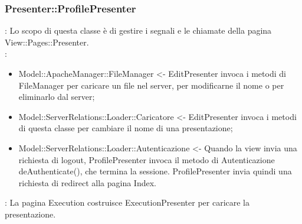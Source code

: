 {						\subsubsection{Presenter::ProfilePresenter}{
										\textbf{\tipo}: Lo scopo di questa classe è di gestire i segnali e le chiamate della pagina View::Pages::Presenter.\\	
										\textbf{\relaz}:
											\begin{itemize}
												\item Model::ApacheManager::FileManager <- EditPresenter invoca i metodi di FileManager per caricare un file nel server, per modificarne il nome o per eliminarlo dal server;
												\item Model::ServerRelations::Loader::Caricatore <- EditPresenter invoca i metodi di questa classe per cambiare il nome di una presentazione;
												\item Model::ServerRelations::Loader::Autenticazione <- Quando la view invia una richiesta di logout, ProfilePresenter invoca il metodo di Autenticazione deAuthenticate(), che termina la sessione. ProfilePresenter invia quindi una richiesta di redirect alla pagina Index.
											\end{itemize}
										\textbf{\interfacce}: La pagina Execution costruisce ExecutionPresenter per caricare la presentazione.\\
								}
							}
	